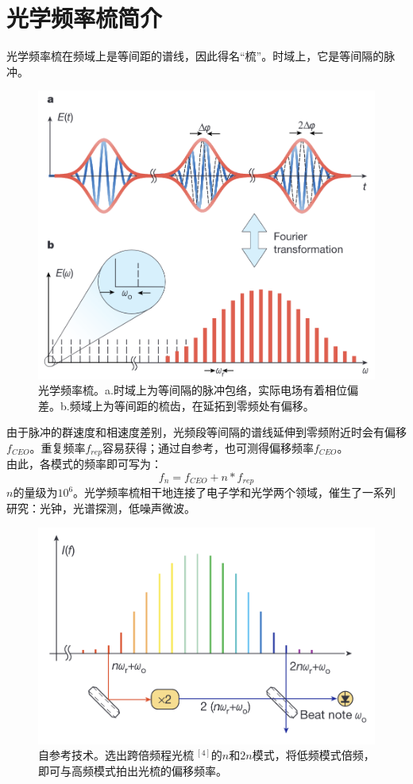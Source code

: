 \section{光学频率梳简介}
光学频率梳在频域上是等间距的谱线，因此得名“梳”。时域上，它是等间隔的脉冲。
\begin{figure}[htbp]
    \centering
    \includegraphics[width=0.7\linewidth]{figure/fig_3.png}
    \caption{光学频率梳。a.时域上为等间隔的脉冲包络，实际电场有着相位偏差。b.频域上为等间距的梳齿，在延拓到零频处有偏移。}
    \label{fig:enter-label}
\end{figure}
由于脉冲的群速度和相速度差别，光频段等间隔的谱线延伸到零频附近时会有偏移$f_{CEO}$。重复频率$f_{rep}$容易获得；通过自参考，也可测得偏移频率$f_{CEO}$。\\
由此，各模式的频率即可写为：
\[f_n = f_{CEO} + n * f_{rep}\]
$n$的量级为$10^6$。光学频率梳相干地连接了电子学和光学两个领域，催生了一系列研究：光钟，光谱探测，低噪声微波。\\
\begin{figure}[htbp]
    \centering
    \includegraphics[width=0.7\linewidth]{figure/fig_2.png}
    \caption{自参考技术。选出跨倍频程光梳$~^{[4]}$的$n$和$2n$模式，将低频模式倍频，即可与高频模式拍出光梳的偏移频率。}
    \label{fig:enter-label}
\end{figure}
